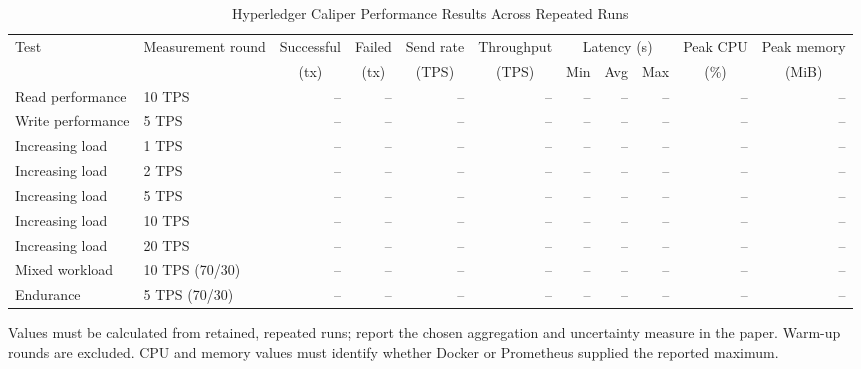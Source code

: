 \begin{table}[t]
  \caption{Hyperledger Caliper Performance Results Across Repeated Runs}
  \label{tab:caliper-performance-results}
  \centering
  \scriptsize
  \begin{tabular}{@{}llrrrrrrrrr@{}}
    \toprule
    Test & Measurement round &
    \multicolumn{1}{c}{Successful} &
    \multicolumn{1}{c}{Failed} &
    \multicolumn{1}{c}{Send rate} &
    \multicolumn{1}{c}{Throughput} &
    \multicolumn{3}{c}{Latency (s)} &
    \multicolumn{1}{c}{Peak CPU} &
    \multicolumn{1}{c}{Peak memory} \\
    \cmidrule(lr){7-9}
     & & \multicolumn{1}{c}{(tx)} & \multicolumn{1}{c}{(tx)} &
    \multicolumn{1}{c}{(TPS)} & \multicolumn{1}{c}{(TPS)} &
    \multicolumn{1}{c}{Min} & \multicolumn{1}{c}{Avg} &
    \multicolumn{1}{c}{Max} & \multicolumn{1}{c}{(\%)} &
    \multicolumn{1}{c}{(MiB)} \\
    \midrule
    Read performance & 10 TPS & -- & -- & -- & -- & -- & -- & -- & -- & -- \\
    Write performance & 5 TPS & -- & -- & -- & -- & -- & -- & -- & -- & -- \\
    Increasing load & 1 TPS & -- & -- & -- & -- & -- & -- & -- & -- & -- \\
    Increasing load & 2 TPS & -- & -- & -- & -- & -- & -- & -- & -- & -- \\
    Increasing load & 5 TPS & -- & -- & -- & -- & -- & -- & -- & -- & -- \\
    Increasing load & 10 TPS & -- & -- & -- & -- & -- & -- & -- & -- & -- \\
    Increasing load & 20 TPS & -- & -- & -- & -- & -- & -- & -- & -- & -- \\
    Mixed workload & 10 TPS (70/30) & -- & -- & -- & -- & -- & -- & -- & -- & -- \\
    Endurance & 5 TPS (70/30) & -- & -- & -- & -- & -- & -- & -- & -- & -- \\
    \bottomrule
  \end{tabular}
  \begin{minipage}{0.99\textwidth}
    \footnotesize
    Values must be calculated from retained, repeated runs; report the chosen
    aggregation and uncertainty measure in the paper. Warm-up rounds are excluded.
    CPU and memory values must identify whether Docker or Prometheus supplied the
    reported maximum.
  \end{minipage}
\end{table}

